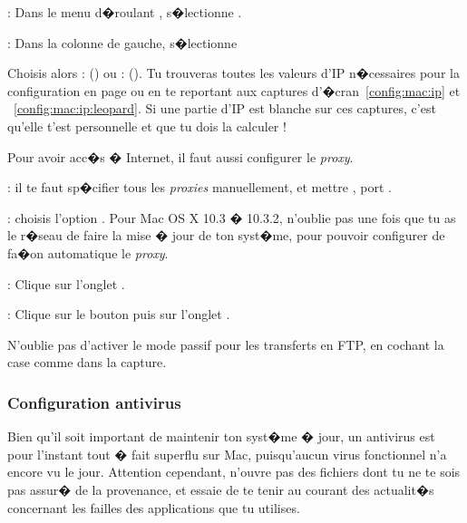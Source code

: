 : Dans le menu d�roulant , s�lectionne
.


 : Dans la colonne de gauche, s�lectionne 

Choisis alors  :  () ou  :  (). Tu
trouveras toutes les valeurs d'IP n�cessaires pour la configuration
en page \pageref{calcul_ip} ou en te reportant aux captures
d'�cran~\ref{config:mac:ip} et ~\ref{config:mac:ip:leopard}. Si une partie d'IP est blanche sur
ces captures, c'est qu'elle t'est personnelle et que tu dois la
calculer !


Pour avoir acc�s � Internet, il faut aussi configurer le \emph{proxy}.

 : il te faut sp�cifier tous les
\emph{proxies} manuellement, et mettre , port .

 :  choisis l'option . Pour Mac OS X 10.3 � 10.3.2, n'oublie pas une fois que tu as le r�seau de faire la mise � jour de ton
syst�me, pour pouvoir configurer de fa�on automatique le \emph{proxy}.

 : Clique sur l'onglet .

 : Clique sur le bouton  puis sur l'onglet .

N'oublie pas d'activer le mode passif pour les transferts en FTP, en cochant la case comme dans la capture.



\subsubsection{Configuration antivirus}

Bien qu'il soit important de maintenir ton syst�me � jour, un antivirus est pour l'instant tout � fait superflu sur Mac, puisqu'aucun virus
fonctionnel n'a encore vu le jour. Attention cependant, n'ouvre pas des fichiers dont tu ne te sois pas assur� de la provenance, et essaie de te
tenir au courant des actualit�s concernant les failles des applications que tu utilises.

